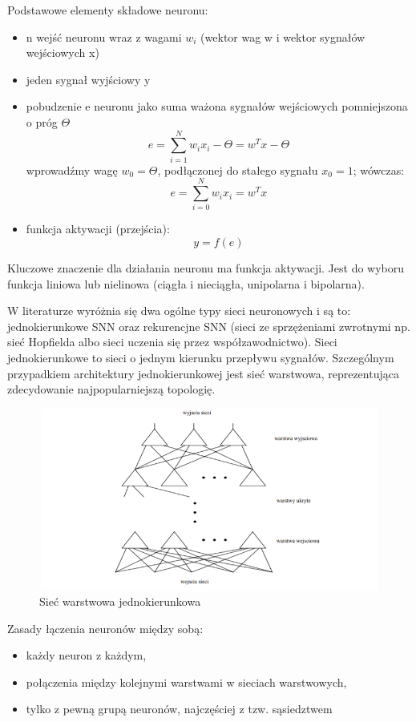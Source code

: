 Podstawowe elementy składowe neuronu: 
\begin{itemize}
    \item n wejść neuronu wraz z wagami $w_{i}$ (wektor wag w i wektor sygnałów wejściowych x)
    \item jeden sygnał wyjściowy y
    \item pobudzenie e neuronu jako suma ważona sygnałów wejściowych
pomniejszona o próg $\Theta$
\[
e = \sum_{i=1}^{N} w_{i} x_{i} - \Theta = w^{T} x - \Theta
\]
wprowadźmy wagę $w_{0}= \Theta$, podłączonej do stałego sygnału $x_{0} = 1$;
wówczas: 
\[
e = \sum_{i=0}^{N} w_{i} x_{i}  = w^{T} x
\]
\item funkcja aktywacji (przejścia):
\[
y = f(e)
\]
\end{itemize}
Kluczowe znaczenie dla działania neuronu ma funkcja aktywacji. Jest do wyboru funkcja liniowa lub nielinowa (ciągła i nieciągła, unipolarna i bipolarna).

W literaturze wyróżnia się dwa ogólne typy sieci neuronowych i są to: jednokierunkowe SNN oraz rekurencjne SNN (sieci ze sprzężeniami zwrotnymi np. sieć Hopfielda albo sieci uczenia się przez współzawodnictwo).
Sieci jednokierunkowe to sieci o jednym kierunku przepływu sygnałów. Szczególnym przypadkiem architektury jednokierunkowej jest sieć warstwowa, reprezentująca zdecydowanie najpopularniejszą topologię.
\begin{figure}[H] 
        \centering\includegraphics[width=12cm,height=6cm]{figures/ArchitekturaSNN.png}
        \caption{Sieć warstwowa jednokierunkowa}\label{SVM-neuron}
\end{figure}

Zasady łączenia neuronów między sobą:
\begin{itemize}
    \item każdy neuron z każdym,
    \item połączenia między kolejnymi warstwami w sieciach warstwowych,
    \item tylko z pewną grupą neuronów, najczęściej z tzw. sąsiedztwem
\end{itemize}


